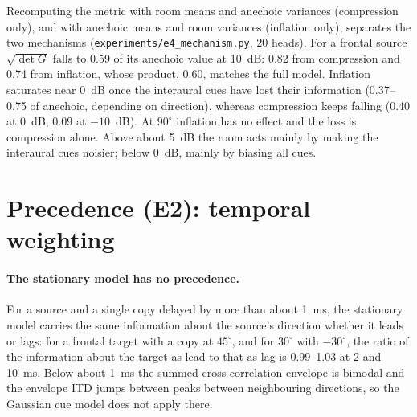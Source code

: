\documentclass[10pt]{article}
\theoremstyle{definition}
\begin{document}
Recomputing the metric with room means and anechoic variances (compression only), and with anechoic means and room variances (inflation only), separates the two mechanisms (\texttt{experiments/e4\_mechanism.py}, 20 heads). For a frontal source $\sqrt{\det G}$ falls to 0.59 of its anechoic value at 10~dB: 0.82 from compression and 0.74 from inflation, whose product, 0.60, matches the full model. Inflation saturates near 0~dB once the interaural cues have lost their information (0.37--0.75 of anechoic, depending on direction), whereas compression keeps falling (0.40 at 0~dB, 0.09 at $-10$~dB). At $90^\circ$ inflation has no effect and the loss is compression alone. Above about 5~dB the room acts mainly by making the interaural cues noisier; below 0~dB, mainly by biasing all cues.

\section{Precedence (E2): temporal weighting}
\paragraph{The stationary model has no precedence.} For a source and a single copy delayed by more than about 1~ms, the stationary model carries the same information about the source's direction whether it leads or lags: for a frontal target with a copy at $45^\circ$, and for $30^\circ$ with $-30^\circ$, the ratio of the information about the target as lead to that as lag is 0.99--1.03 at 2 and 10~ms. Below about 1~ms the summed cross-correlation envelope is bimodal and the envelope ITD jumps between peaks between neighbouring directions, so the Gaussian cue model does not apply there.
\end{document}
